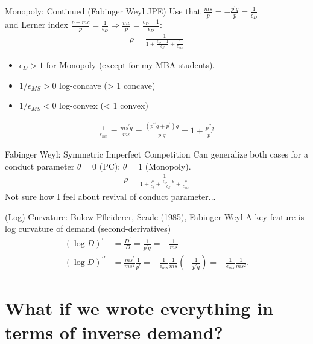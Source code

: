 \begin{frame}{Monopoly: Continued (Fabinger Weyl JPE)}
Use that $\frac{m s}{p}=-\frac{p^{\prime} q}{p}=\frac{1}{\epsilon_D}$\\
 and Lerner index $\frac{p-m c}{p}=\frac{1}{\epsilon_D} \Rightarrow \frac{m c}{p}=\frac{\epsilon_D-1}{\epsilon_D}$:
\begin{align*}
\rho=\frac{1}{1+\frac{\epsilon_D-1}{\epsilon_S}+\frac{1}{\epsilon_{m s}}}
\end{align*}
\begin{itemize}
\item $\epsilon_D >1$ for Monopoly (except for my MBA students).
\item $1/\epsilon_{MS} >0$ log-concave (> 1 concave)
\item $1/\epsilon_{MS} <0$ log-convex  (< 1 convex)
\end{itemize}
\begin{align*}
\frac{1}{\epsilon_{m s}}=\frac{m s^{\prime} q}{m s}=\frac{\left(p^{\prime \prime} q+p^{\prime}\right) q}{p^{\prime} q}=1+\frac{p^{\prime \prime} q}{p^{\prime}}
\end{align*}
\end{frame}

\begin{frame}{Fabinger Weyl: Symmetric Imperfect Competition}
Can generalize both cases for a conduct parameter $\theta=0$ (PC); $\theta=1$ (Monopoly).
\begin{align*}
\rho=\frac{1}{1+\frac{\theta}{\epsilon_\theta}+\frac{\epsilon_D-\theta}{\epsilon_S}+\frac{\theta}{\epsilon_{m s}}}
\end{align*}
Not sure how I feel about revival of conduct parameter...
\end{frame}



\begin{frame}{(Log) Curvature: Bulow Pfleiderer, Seade (1985), Fabinger Weyl}
A key feature is \alert{log curvature} of demand (second-derivatives)
\begin{align*}
(\log D)^{\prime}&=\frac{D^{\prime}}{D}=\frac{1}{p^{\prime} q}=-\frac{1}{m s}\\
(\log D)^{\prime \prime}&=\frac{m s^{\prime}}{m s^2} \frac{1}{p^{\prime}}=-\frac{1}{\epsilon_{m s}} \frac{1}{m s}\left(-\frac{1}{p^{\prime} q}\right)=-\frac{1}{\epsilon_{m s}} \frac{1}{m s^2}.
\end{align*}
\end{frame}


\section*{What if we wrote everything in terms of inverse demand?}

